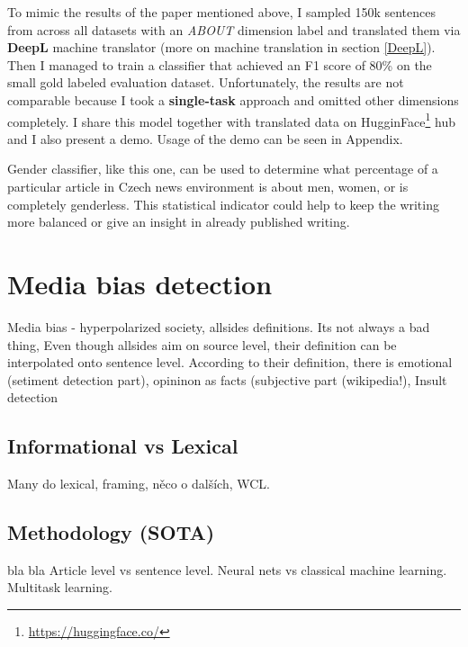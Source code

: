 To mimic the results of the paper mentioned above, I sampled 150k sentences from across all datasets with an \textit{ABOUT} dimension label and translated them via \textbf{DeepL} machine translator (more on machine translation in section \ref{DeepL}). Then I managed to train a classifier that achieved an F1 score of 80\% on the small gold labeled evaluation dataset. Unfortunately, the results are not comparable because I took a \textbf{single-task} approach and omitted other dimensions completely. I share this model together with translated data on HugginFace\footnote{\url{https://huggingface.co/}} hub and I also present a demo. Usage of the demo can be seen in Appendix.

Gender classifier, like this one, can be used to determine what percentage of a particular article in Czech news environment is about men, women, or is completely genderless. This statistical indicator could help to keep the writing more balanced or give an insight in already published writing.


\section{Media bias detection}
Media bias - hyperpolarized society, allsides definitions. Its not always a bad thing, Even though allsides aim on source level, their definition can be interpolated onto sentence level. According to their definition, there is emotional (setiment detection part), opininon as facts (subjective part (wikipedia!), Insult detection
\subsection{Informational vs Lexical}
Many do lexical, framing, něco o dalších, WCL.
\subsection{Methodology (SOTA)}\label{methodology}
bla bla Article level vs sentence level. Neural nets vs classical machine learning. Multitask learning.


